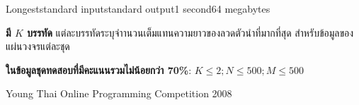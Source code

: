 \documentclass[11pt,a4paper]{article}
\begin{document}
\begin{problem}{Longest}{standard input}{standard output}{1 second}{64 megabytes}
\OutputFile

\textbf{มี $K$ บรรทัด} แต่ละบรรทัดระบุจำานวนเต็มแทนความยาวของลวดตัวนำที่มากที่สุด สำหรับข้อมูลของแผ่นวงจรแต่ละชุด

\Examples

\begin{example}
%
\end{example}

\Scoring

\textbf{ในข้อมูลชุดทดสอบที่มีคะแนนรวมไม่น้อยกว่า 70\%}:  $K \leq 2; N \leq 500; M \leq 500$


\Source

Young Thai Online Programming Competition 2008

\end{problem}
\end{document}
